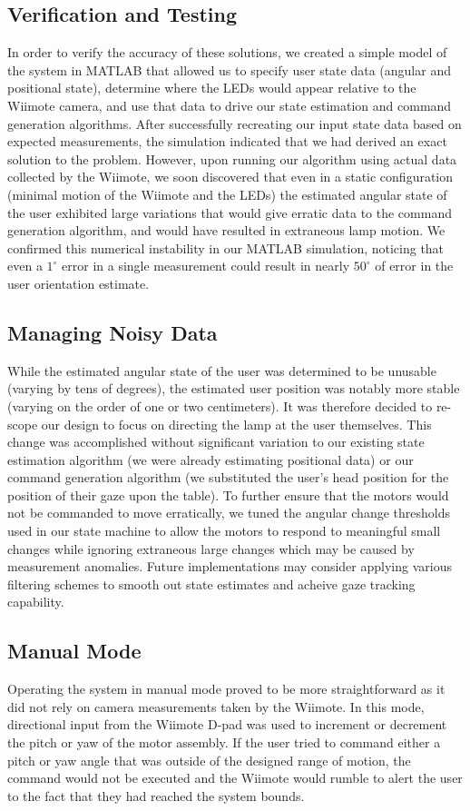 \documentclass[conference, twocolumn]{IEEEtran}
\newcommand{\degree}{^{\circ}}
\begin{document}
\subsection*{Verification and Testing}
In order to verify the accuracy of these solutions, we created a simple model of the system in MATLAB that allowed us to specify user state data (angular and positional state), determine where the LEDs would appear relative to the Wiimote camera, and use that data to drive our state estimation and command generation algorithms. After successfully recreating our input state data based on expected measurements, the simulation indicated that we had derived an exact solution to the problem. However, upon running our algorithm using actual data collected by the Wiimote, we soon discovered that even in a static configuration (minimal motion of the Wiimote and the LEDs) the estimated angular state of the user exhibited large variations that would give erratic data to the command generation algorithm, and would have resulted in extraneous lamp motion. We confirmed this numerical instability in our MATLAB simulation, noticing that even a $1\degree$ error in a single measurement could result in nearly $50\degree$ of error in the user orientation estimate.

\subsection*{Managing Noisy Data}
While the estimated angular state of the user was determined to be unusable (varying by tens of degrees), the estimated user position was notably more stable (varying on the order of one or two centimeters). It was therefore decided to re-scope our design to focus on directing the lamp at the user themselves. This change was accomplished without significant variation to our existing state estimation algorithm (we were already estimating positional data) or our command generation algorithm (we substituted the user's head position for the position of their gaze upon the table). To further ensure that the motors would not be commanded to move erratically, we tuned the angular change thresholds used in our state machine to allow the motors to respond to meaningful small changes while ignoring extraneous large changes which may be caused by measurement anomalies. Future implementations may consider applying various filtering schemes to smooth out state estimates and acheive gaze tracking capability.

\subsection*{Manual Mode}
Operating the system in manual mode proved to be more straightforward as it did not rely on camera measurements taken by the Wiimote. In this mode, directional input from the Wiimote D-pad was used to increment or decrement the pitch or yaw of the motor assembly. If the user tried to command either a pitch or yaw angle that was outside of the designed range of motion, the command would not be executed and the Wiimote would rumble to alert the user to the fact that they had reached the system bounds.
\end{document}
